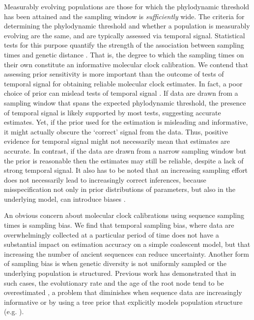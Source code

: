 \documentclass[11pt]{article}
\begin{document}
Measurably evolving populations are those for which the phylodynamic threshold has been attained and the sampling window is \textit{sufficiently} wide. The criteria for determining the phylodynamic threshold and whether a population is measurably evolving are the same, and are typically assessed via temporal signal. Statistical tests for this purpose quantify the strength of the association between sampling times and genetic distance \citep{rieux2016inferences, duchene2015performance, murray2016effect, featherstone2024clockor2, rambaut2016exploring}. That is, the degree to which the sampling times on their own constitute an informative molecular clock calibration. We contend that assessing prior sensitivity is more important than the outcome of tests of temporal signal for obtaining reliable molecular clock estimates. In fact, a poor choice of prior can mislead tests of temporal signal \citep{tay2024assessing}. If data are drawn from a sampling window that spans the expected phylodynamic threshold, the presence of temporal signal is likely supported by most tests, suggesting accurate estimates. Yet, if the prior used for the estimation is misleading and informative, it might actually obscure the `correct' signal from the data. Thus, positive evidence for temporal signal might not necessarily mean that estimates are accurate. In contrast, if the data are drawn from a narrow sampling window but the prior is reasonable then the estimates may still be reliable, despite a lack of strong temporal signal. It also has to be noted that an increasing sampling effort does not necessarily lead to increasingly correct inferences, because misspecification not only in prior distributions of parameters, but also in the underlying model, can introduce biases \citep{ferretti2024biased, moller2018impact}.

An obvious concern about molecular clock calibrations using sequence sampling times is sampling bias. We find that temporal sampling bias, where data are overwhelmingly collected at a particular period of time does not have a substantial impact on estimation accuracy on a simple coalescent model, but that increasing the number of ancient sequences can reduce uncertainty. Another form of sampling bias is when genetic diversity is not uniformly sampled or the underlying population is structured. Previous work has demonstrated that in such cases, the evolutionary rate and the age of the root node tend to be overestimated \citep{moller2018impact}, a problem that diminishes when sequence data are increasingly informative or by using a tree prior that explicitly models population structure (e.g. \citealt{kuhnert2016phylodynamics, muller2017structured}). 
\end{document}
